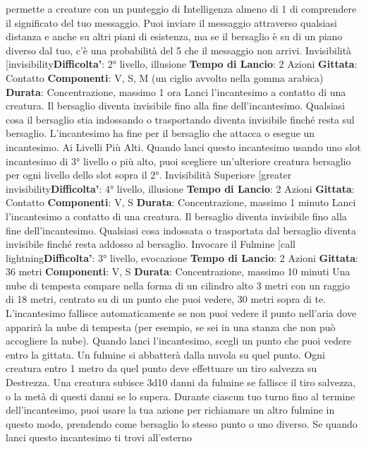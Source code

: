 \begin{multicols}{2}
permette a creature con un punteggio di Intelligenza
almeno di 1 di comprendere il significato del tuo
messaggio.
Puoi inviare il messaggio attraverso qualsiasi distanza e
anche su altri piani di esistenza, ma se il bersaglio è su
di un piano diverso dal tuo, c’è una probabilità del 5%
che il messaggio non arrivi.
Invisibilità
[invisibility\textbf{Difficolta'}:
2° livello, illusione
\textbf{Tempo di Lancio}: 2 Azioni
\textbf{Gittata}: Contatto
\textbf{Componenti}: V, S, M (un ciglio avvolto nella gomma
arabica)
\textbf{Durata}: Concentrazione, massimo 1 ora
Lanci l’incantesimo a contatto di una creatura. Il
bersaglio diventa invisibile fino alla fine
dell’incantesimo. Qualsiasi cosa il bersaglio stia
indossando o trasportando diventa invisibile finché
resta sul bersaglio. L’incantesimo ha fine per il
bersaglio che attacca o esegue un incantesimo.
Ai Livelli Più Alti. Quando lanci questo incantesimo
usando uno slot incantesimo di 3° livello o più alto, puoi
scegliere un’ulteriore creatura bersaglio per ogni livello
dello slot sopra il 2°.
Invisibilità Superiore
[greater invisibility\textbf{Difficolta'}:
4° livello, illusione
\textbf{Tempo di Lancio}: 2 Azioni
\textbf{Gittata}: Contatto
\textbf{Componenti}: V, S
\textbf{Durata}: Concentrazione, massimo 1 minuto
Lanci l’incantesimo a contatto di una creatura. Il
bersaglio diventa invisibile fino alla fine
dell’incantesimo. Qualsiasi cosa indossata o trasportata
dal bersaglio diventa invisibile finché resta addosso al
bersaglio.
Invocare il Fulmine
[call lightning\textbf{Difficolta'}:
3° livello, evocazione
\textbf{Tempo di Lancio}: 2 Azioni
\textbf{Gittata}: 36 metri
\textbf{Componenti}: V, S
\textbf{Durata}: Concentrazione, massimo 10 minuti
Una nube di tempesta compare nella forma di un
cilindro alto 3 metri con un raggio di 18 metri, centrato
su di un punto che puoi vedere, 30 metri sopra di te.
L’incantesimo fallisce automaticamente se non puoi
vedere il punto nell’aria dove apparirà la nube di
tempesta (per esempio, se sei in una stanza che non
può accogliere la nube).
Quando lanci l’incantesimo, scegli un punto che puoi
vedere entro la gittata. Un fulmine si abbatterà dalla
nuvola su quel punto. Ogni creatura entro 1 metro da
quel punto deve effettuare un tiro salvezza su
Destrezza. Una creatura subisce 3d10 danni da fulmine
se fallisce il tiro salvezza, o la metà di questi danni se lo
supera. Durante ciascun tuo turno fino al termine
dell’incantesimo, puoi usare la tua azione per
richiamare un altro fulmine in questo modo, prendendo
come bersaglio lo stesso punto o uno diverso.
Se quando lanci questo incantesimo ti trovi all’esterno

\end{multicols}
